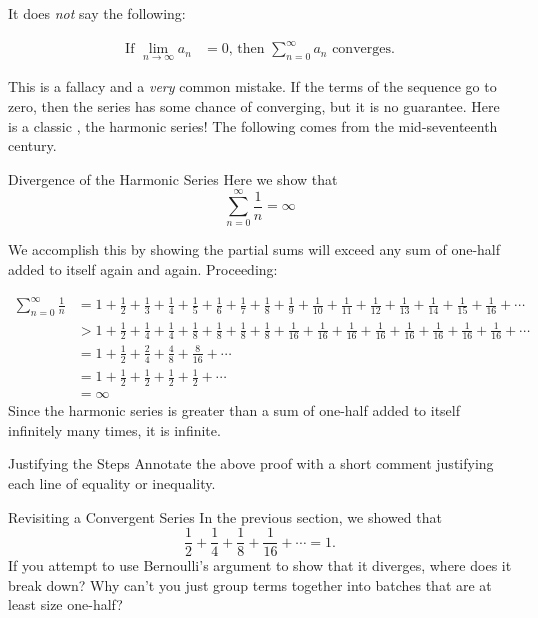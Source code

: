 It does \emph{not} say the following: 
\begin{center}
\begin{align*}
\text{If }\lim_{n\rightarrow \infty} a_n  &= 0\text{, then }\sum_{n=0}^\infty a_n\text{ converges.} \tag{\Frowny}
\end{align*}
\end{center}
  This is a fallacy and a \emph{very} common mistake.  If the terms of the sequence go to zero, then the series has some chance of converging, but it is no guarantee.  Here is a classic , the harmonic series!  The following  comes from the mid-seventeenth century.

\begin{example}{Divergence of the Harmonic Series}\label{Bern}
Here we show that $$\sum_{n=0}^\infty \frac{1}{n}=\infty $$

We accomplish this by showing the partial sums will exceed any sum of one-half added to itself again and again.  Proceeding:

\begin{align*}
\sum_{n=0}^\infty \frac{1}{n}&=1+\frac{1}{2}+\frac{1}{3}+\frac{1}{4}+\frac{1}{5}+\frac{1}{6}+\frac{1}{7}+\frac{1}{8}+\frac{1}{9}+\frac{1}{10}+\frac{1}{11}+\frac{1}{12}+\frac{1}{13}+\frac{1}{14}+\frac{1}{15}+\frac{1}{16}+\cdots \\
&>1+\frac{1}{2}+\frac{1}{4}+\frac{1}{4}+\frac{1}{8}+\frac{1}{8}+\frac{1}{8}+\frac{1}{8}+\frac{1}{16}+\frac{1}{16}+\frac{1}{16}+\frac{1}{16}+\frac{1}{16}+\frac{1}{16}+\frac{1}{16}+\frac{1}{16}+\cdots \\
&=1+\frac{1}{2}+\frac{2}{4}+\frac{4}{8}+\frac{8}{16}+\cdots \\
&=1+\frac{1}{2}+\frac{1}{2}+\frac{1}{2}+\frac{1}{2}+\cdots \\
&=\infty
\end{align*}
Since the harmonic series is greater than a sum of one-half added to itself infinitely many times, it is infinite.
\end{example}

\begin{exercise}{Justifying the Steps \Coffeecup \Coffeecup}
Annotate the above proof with a short comment justifying each line of equality or inequality.
\end{exercise}

\begin{exercise}{Revisiting a Convergent Series \Coffeecup \Coffeecup \Coffeecup}
In the previous section, we showed that $$\frac{1}{2}+\frac{1}{4}+\frac{1}{8}+\frac{1}{16}+\cdots=1.$$
If you attempt to use Bernoulli's argument to show that it diverges, where does it break down?  Why can't you just group terms together into batches that are at least size one-half?
\vspace*{.5in}
\end{exercise}

